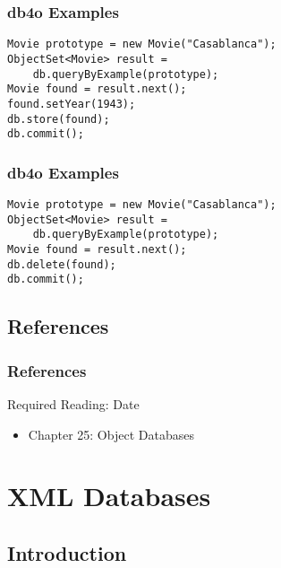 \documentclass[dvipsnames]{beamer}
\theoremstyle{plain}
\begin{document}
\begin{frame}[fragile]
  \frametitle{db4o Examples}

  \begin{example}[update]
    \begin{lstlisting}
Movie prototype = new Movie("Casablanca");
ObjectSet<Movie> result =
    db.queryByExample(prototype);
Movie found = result.next();
found.setYear(1943);
db.store(found);
db.commit();
    \end{lstlisting}
  \end{example}
\end{frame}

\begin{frame}[fragile]
  \frametitle{db4o Examples}

  \begin{example}[delete]
    \begin{lstlisting}
Movie prototype = new Movie("Casablanca");
ObjectSet<Movie> result =
    db.queryByExample(prototype);
Movie found = result.next();
db.delete(found);
db.commit();
    \end{lstlisting}
  \end{example}
\end{frame}

\subsection*{References}

\begin{frame}
  \frametitle{References}

  \begin{block}{Required Reading: Date}
    \begin{itemize}
      \item Chapter 25: \alert{Object Databases}
    \end{itemize}
  \end{block}
\end{frame}


\section{XML Databases}

\subsection{Introduction}
\end{document}
